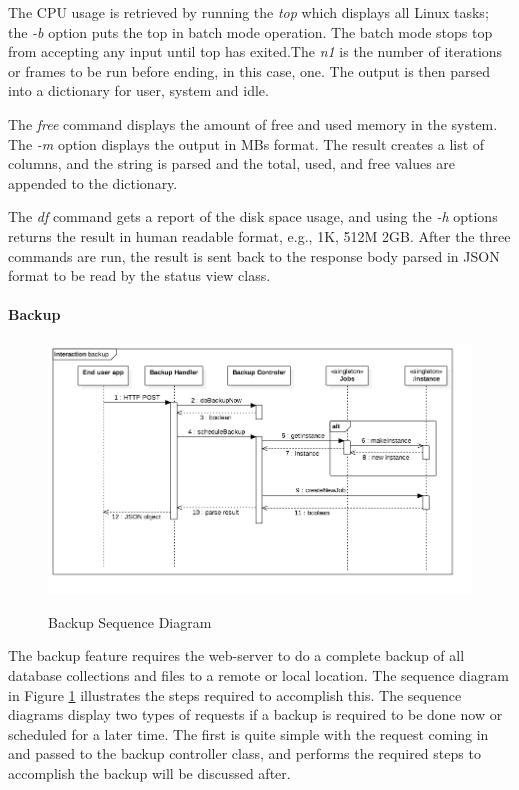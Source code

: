 The CPU usage is retrieved by running the \textit{top} which displays all Linux tasks; the \textit{-b} option puts the top in batch mode operation. The batch mode stops top from accepting any input until top has exited.The \textit{n1} is the number of iterations or frames to be run before ending, in this case, one. The output is then parsed into a dictionary for user, system and idle. 

The \textit{free} command displays the amount of free and used memory in the system. The \textit{-m} option displays the output in MBs format. The result creates a list of columns, and the string is parsed and the total, used, and free values are appended to the dictionary. 

The \textit{df} command gets a report of the disk space usage, and using the \textit{-h} options returns the result in human readable format, e.g., 1K, 512M 2GB. After the three commands are run, the result is sent back to the response body parsed in JSON format to be read by the status view class.

\paragraph{Backup}

\begin{figure}[!h]
    \caption{Backup Sequence Diagram}
    \centering
    \includegraphics[width=150mm]{images/sequence/backup}
    \label{fig:backup-s}
\end{figure}

The backup feature requires the web-server to do a complete backup of all database collections and files to a remote or local location. The sequence diagram in Figure \ref{fig:backup-s} illustrates the steps required to accomplish this. The sequence diagrams display two types of requests if a backup is required to be done now or scheduled for a later time. The first is quite simple with the request coming in and passed to the backup controller class, and performs the required steps to accomplish the backup will be discussed after.

